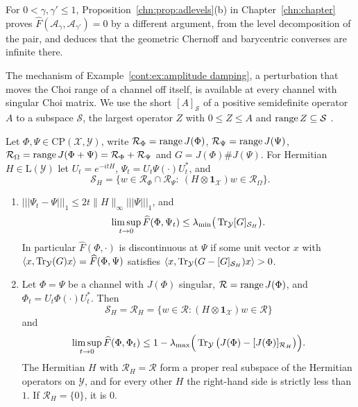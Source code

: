 For $0<\gamma,\gamma'\le1$, Proposition~\ref{chn:prop:adlevels}(b) in Chapter~\ref{chn:chapter} proves $\widehat F(\mathcal{A}_\gamma,\mathcal{A}_{\gamma'})=0$ by a different argument, from the level decomposition of the pair, and deduces that the geometric Chernoff and barycentric converses are infinite there.

The mechanism of Example~\ref{cont:ex:amplitude damping}, a perturbation that moves the Choi range of a channel off itself, is available at every channel with singular Choi matrix. We use the short $[A]_{\mathcal{S}}$ of a positive semidefinite operator $A$ to a subspace $\mathcal{S}$, the largest operator $Z$ with $0\leq Z\leq A$ and $\operatorname{range} Z\subseteq\mathcal{S}$ \cite{Anderson1971,AndersonTrapp1975}.

\begin{theorem}\label{cont:thm:channel orbit}
Let $\Phi,\Psi\in\mathrm{CP}(\mathcal{X},\mathcal{Y})$, write $\mathcal{R}_\Phi=\operatorname{range} J(\Phi)$, $\mathcal{R}_\Psi=\operatorname{range} J(\Psi)$, $\mathcal{R}_\Omega=\operatorname{range} J(\Phi+\Psi)=\mathcal{R}_\Phi+\mathcal{R}_\Psi$ and $G=J(\Phi)\#J(\Psi)$. For Hermitian $H\in\mathrm{L}(\mathcal{Y})$ let $U_t=e^{-itH}$, $\Psi_t=U_t\Psi(\cdot)U_t^*$, and
\[
\mathcal{S}_H=\big\{w\in\mathcal{R}_\Phi\cap\mathcal{R}_\Psi:\ (H\otimes\mathbf{1}_{\mathcal{X}})w\in\mathcal{R}_\Omega\big\}.
\]
\begin{enumerate}
\item[(a)] $|||\Psi_t-\Psi|||_1\leq2t\|H\|_\infty|||\Psi|||_1$, and
\[
\limsup_{t\to0}\widehat{F}(\Phi,\Psi_t)\leq\lambda_{\min}\big(\operatorname{Tr}_{\mathcal{Y}}[G]_{\mathcal{S}_H}\big).
\]
In particular $\widehat{F}(\Phi,\cdot)$ is discontinuous at $\Psi$ if some unit vector $x$ with $\langle x,\operatorname{Tr}_{\mathcal{Y}}(G)x\rangle=\widehat{F}(\Phi,\Psi)$ satisfies $\langle x,\operatorname{Tr}_{\mathcal{Y}}(G-[G]_{\mathcal{S}_H})x\rangle>0$.
\item[(b)] Let $\Phi=\Psi$ be a channel with $J(\Phi)$ singular, $\mathcal{R}=\operatorname{range} J(\Phi)$, and $\Phi_t=U_t\Phi(\cdot)U_t^*$. Then
\[
\mathcal{S}_H=\mathcal{R}_H=\{w\in\mathcal{R}:(H\otimes\mathbf{1}_{\mathcal{X}})w\in\mathcal{R}\}
\]
and
\[
\limsup_{t\to0}\widehat{F}(\Phi,\Phi_t)\leq1-\lambda_{\max}\Big(\operatorname{Tr}_{\mathcal{Y}}\big(J(\Phi)-[J(\Phi)]_{\mathcal{R}_H}\big)\Big).
\]
The Hermitian $H$ with $\mathcal{R}_H=\mathcal{R}$ form a proper real subspace of the Hermitian operators on $\mathcal{Y}$, and for every other $H$ the right-hand side is strictly less than $1$. If $\mathcal{R}_H=\{0\}$, it is $0$.
\end{enumerate}
\end{theorem}

